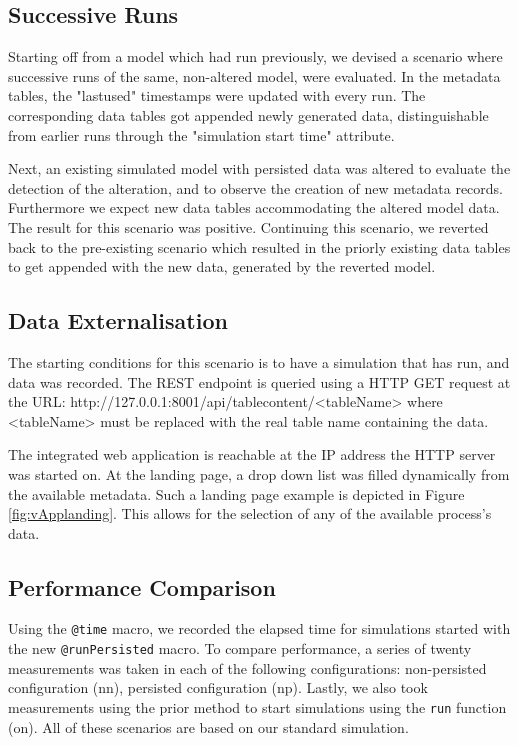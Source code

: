 \documentclass{juliacon}
\begin{document}
\subsection{Successive Runs}

Starting off from a model which had run previously, we devised a scenario where successive runs of the same, non-altered model, were evaluated. In the metadata tables, the "lastused" timestamps were updated with every run. The corresponding data tables got appended newly generated data, distinguishable from earlier runs through the "simulation start time" attribute.\vskip 6pt

Next, an existing simulated model with persisted data was altered to evaluate the detection of the alteration, and to observe the creation of new metadata records. Furthermore we expect new data tables accommodating the altered model data. The result for this scenario was positive. Continuing this scenario, we reverted back to the pre-existing scenario which resulted in the priorly existing data tables to get appended with the new data, generated by the reverted model. \vskip 6pt

\subsection{Data Externalisation}

The starting conditions for this scenario is to have a simulation that has run, and data was recorded. The REST endpoint is queried using a HTTP GET request  at the URL: http://127.0.0.1:8001/api/tablecontent/<tableName> where <tableName> must be replaced with the real table name containing the data.\vskip 6pt

The integrated web application is reachable at the IP address the HTTP server was started on. At the landing page, a drop down list was filled dynamically from the available metadata. Such a landing page example is depicted in Figure \ref{fig:vApplanding}. This allows for the selection of any of the available process's data.\vskip 6pt

\subsection{Performance Comparison}

Using the \texttt{@time} macro, we recorded the elapsed time for simulations started with the new \texttt{@runPersisted} macro. To compare performance, a series of twenty measurements was taken in each of the following configurations: non-persisted configuration (nn), persisted configuration (np). Lastly, we also took measurements using the prior method to start simulations using the \texttt{run} function (on). All of these scenarios are based on our standard simulation. \vskip 6pt
\end{document}
